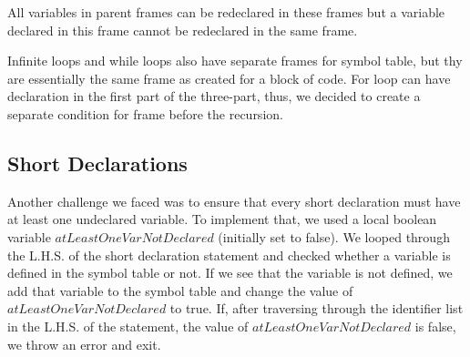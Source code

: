 \documentclass[preprint,12pt]{elsarticle}
\begin{document}
All variables in parent frames can be redeclared in these frames but a variable declared in this frame cannot be redeclared in the same frame.

Infinite loops and while loops also have separate frames for symbol table, but thy are essentially the same frame as created for a block of code. For loop can have declaration in the first part of the three-part, thus, we decided to create a separate condition for frame before the recursion.

\subsection{Short Declarations}

Another challenge we faced was to ensure that every short declaration must have at least one undeclared variable. To implement that, we used a local boolean variable $atLeastOneVarNotDeclared$ (initially set to false). We looped through the L.H.S. of the short declaration statement and checked whether a variable is defined in the symbol table or not. If we see that the variable is not defined, we add that variable to the symbol table and change the value of $atLeastOneVarNotDeclared$ to true. If, after traversing through the identifier list in the L.H.S. of the statement, the value of $atLeastOneVarNotDeclared$ is false, we throw an error and exit.
\end{document}
